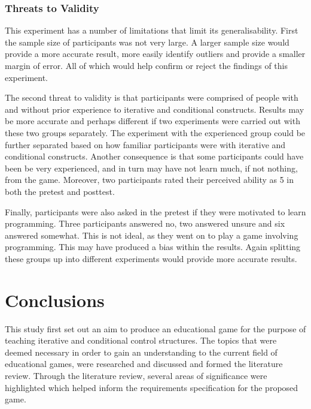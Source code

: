 \documentclass[a4paper,11.5pt]{report}
\numberwithin{figure}{section}
\numberwithin{table}{section}
\numberwithin{equation}{section}
\numberwithin{equation}{section}
\newcommand\blankpage{%
    \null
    \thispagestyle{empty}%
    \addtocounter{page}{-1}%
    \newpage}
\begin{document}
\subsection{Threats to Validity}

This experiment has a number of limitations that limit its generalisability. First the sample size of participants was not very large. A larger sample size would provide a more accurate result, more easily identify outliers and provide a smaller margin of error. All of which would help confirm or reject the findings of this experiment.

The second threat to validity is that participants were comprised of people with and without prior experience to iterative and conditional constructs. Results may be more accurate and perhaps different if two experiments were carried out with these two groups separately. The experiment with the experienced group could be further separated based on how familiar participants were with iterative and conditional constructs. Another consequence is that some participants could have been be very experienced, and in turn may have not learn much, if not nothing, from the game. Moreover, two participants rated their perceived ability as 5 in both the pretest and posttest.

Finally, participants were also asked in the pretest if they were motivated to learn programming. Three participants answered no, two answered unsure and six answered somewhat. This is not ideal, as they went on to play a game involving programming. This may have produced a bias within the results. Again splitting these groups up into different experiments would provide more accurate results.


\afterpage{\blankpage}



\chapter{Conclusions}


This study first set out an aim to produce an educational game for the purpose of teaching iterative and conditional control structures. The topics that were deemed necessary in order to gain an understanding to the current field of educational games, were researched and discussed and formed the literature review. Through the literature review, several areas of significance were highlighted which helped inform the requirements specification for the proposed game.
\end{document}
